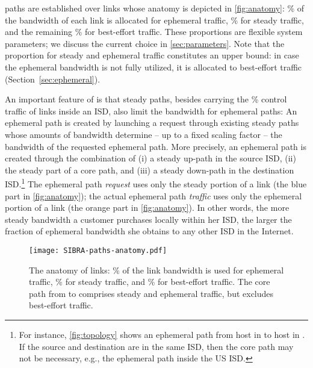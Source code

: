 \name paths are established over \name links whose anatomy
is depicted in \autoref{fig:anatomy}: \bweph\% of
the bandwidth of each \name link is allocated for ephemeral traffic, \bwstd\% for
steady traffic, and the remaining \bwbst\% for best-effort traffic.
These proportions are flexible system parameters; we discuss the current choice
in \autoref{sec:parameters}. Note that the proportion for steady and ephemeral
traffic constitutes an upper bound: in case the ephemeral bandwidth is not
fully utilized, it is allocated to best-effort traffic
(Section~\ref{sec:ephemeral}).

An important feature of \name is that steady paths, besides carrying the
\bwstd\% control traffic of links inside an ISD, also limit the bandwidth for ephemeral
paths: An ephemeral path is created by launching a request through existing
steady paths whose amounts of bandwidth determine -- up to a fixed scaling factor
-- the bandwidth of the requested ephemeral path. More precisely, an ephemeral
path is created through the combination of (i) a steady up-path in the source
ISD, (ii) the steady part of a core path, and (iii) a steady down-path in the
destination ISD.\footnote{For instance, \autoref{fig:topology} shows an
ephemeral path from host  in  to host  in . If the source and
destination are in the same ISD, then the core path may not be necessary, e.g.,
the ephemeral path inside the US ISD.} The ephemeral path \emph{request} uses
only the steady portion of a link (the blue part in \autoref{fig:anatomy}); the
actual ephemeral path \emph{traffic} uses only the ephemeral portion of a link
(the orange part in \autoref{fig:anatomy}). In other words, the more steady
bandwidth a customer purchases locally within her ISD, the larger the fraction
of ephemeral bandwidth she obtains to any other ISD in the Internet.


\begin{figure}[t]
  \begin{center}
    \texttt{[image: SIBRA-paths-anatomy.pdf]}
  \end{center}
  \vspace{-3mm}
  \caption{The anatomy of \name links: \bweph\% of the link bandwidth is used
  for ephemeral traffic, \bwstd\% for steady traffic, and \bwbst\% for
  best-effort traffic. The core path from  to  comprises
  steady and ephemeral traffic, but excludes best-effort traffic.}
  \vspace{-7mm}
  \label{fig:anatomy}
\end{figure}


